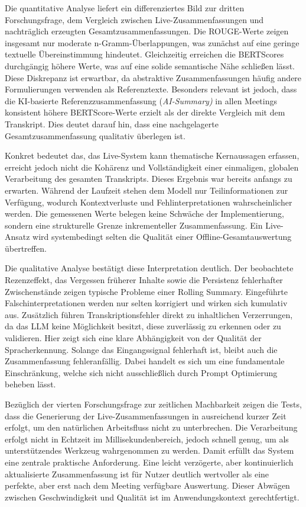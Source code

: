 Die quantitative Analyse liefert ein differenziertes Bild zur dritten Forschungsfrage, dem Vergleich zwischen Live-Zusammenfassungen und nachträglich erzeugten Gesamtzusammenfassungen. Die ROUGE-Werte zeigen insgesamt nur moderate n-Gramm-Überlappungen, was zunächst auf eine geringe textuelle Übereinstimmung hindeutet. Gleichzeitig erreichen die BERTScores durchgängig höhere Werte, was auf eine solide semantische Nähe schließen lässt. Diese Diskrepanz ist erwartbar, da abstraktive Zusammenfassungen häufig andere Formulierungen verwenden als Referenztexte. Besonders relevant ist jedoch, dass die KI-basierte Referenzzusammenfassung (\textit{AI-Summary)} in allen Meetings konsistent höhere BERTScore-Werte erzielt als der direkte Vergleich mit dem Transkript. Dies deutet darauf hin, dass eine nachgelagerte Gesamtzusammenfassung qualitativ überlegen ist.

Konkret bedeutet das, das Live-System kann thematische Kernaussagen erfassen, erreicht jedoch nicht die Kohärenz und Vollständigkeit einer einmaligen, globalen Verarbeitung des gesamten Transkripts. Dieses Ergebnis war bereits anfangs zu erwarten. Während der Laufzeit stehen dem Modell nur Teilinformationen zur Verfügung, wodurch Kontextverluste und Fehlinterpretationen wahrscheinlicher werden. Die gemessenen Werte belegen keine Schwäche der Implementierung, sondern eine strukturelle Grenze inkrementeller Zusammenfassung. Ein Live-Ansatz wird systembedingt selten die Qualität einer Offline-Gesamtauswertung übertreffen. 

Die qualitative Analyse bestätigt diese Interpretation deutlich. Der beobachtete Rezenzeffekt, das Vergessen früherer Inhalte sowie die Persistenz fehlerhafter Zwischenstände zeigen typische Probleme einer Rolling Summary. Eingeführte Falschinterpretationen werden nur selten korrigiert und wirken sich kumulativ aus. Zusätzlich führen Transkriptionsfehler direkt zu inhaltlichen Verzerrungen, da das LLM keine Möglichkeit besitzt, diese zuverlässig zu erkennen oder zu validieren. Hier zeigt sich eine klare Abhängigkeit von der Qualität der Spracherkennung. Solange das Eingangssignal fehlerhaft ist, bleibt auch die Zusammenfassung fehleranfällig. Dabei handelt es sich um eine fundamentale Einschränkung, welche sich nicht ausschließlich durch Prompt Optimierung beheben lässt.

Bezüglich der vierten Forschungsfrage zur zeitlichen Machbarkeit zeigen die Tests, dass die Generierung der Live-Zusammenfassungen in ausreichend kurzer Zeit erfolgt, um den natürlichen Arbeitsfluss nicht zu unterbrechen. Die Verarbeitung erfolgt nicht in Echtzeit im Millisekundenbereich, jedoch schnell genug, um als unterstützendes Werkzeug wahrgenommen zu werden. Damit erfüllt das System eine zentrale praktische Anforderung. Eine leicht verzögerte, aber kontinuierlich aktualisierte Zusammenfassung ist für Nutzer deutlich wertvoller als eine perfekte, aber erst nach dem Meeting verfügbare Auswertung. Dieser Abwägen zwischen Geschwindigkeit und Qualität ist im Anwendungskontext gerechtfertigt.

